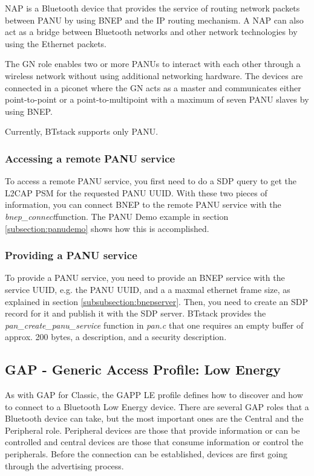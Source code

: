 NAP is a Bluetooth device that provides the service of routing network packets between PANU by using BNEP and the IP routing mechanism. A NAP can also act as a bridge between Bluetooth networks and other network technologies by using the Ethernet packets.

The GN role enables two or more PANUs to interact with each other through a wireless network without using additional networking hardware. The devices are connected in a piconet where the GN acts as a master and communicates either point-to-point or a point-to-multipoint with a maximum of seven PANU slaves by using BNEP.

Currently, BTstack supports only PANU.

\subsubsection{Accessing a remote PANU service}
To access a remote PANU service, you first need to do a SDP query to get the L2CAP PSM for the requested PANU UUID.
With these two pieces of information, you can connect BNEP to the remote PANU service with the \emph{bnep\_connect}function. The PANU Demo example in section \ref{subsection:panudemo} shows how this is accomplished.

\subsubsection{Providing a PANU service}
To provide a PANU service, you need to provide an BNEP service with the service UUID, e.g. the PANU UUID, and a a maxmal ethernet frame size, as explained in section \ref{subsubsection:bnepserver}. Then, you need to create an SDP record for it and publish it with the SDP server. BTstack provides the \emph{pan\_create\_panu\_service} function in \emph{pan.c} that one requires an empty buffer of approx. 200 bytes, a description, and a security description.

\subsection{GAP - Generic Access Profile: Low Energy}
As with GAP for Classic, the GAPP LE profile defines how to discover and how to connect to a Bluetooth Low Energy device. There are several GAP roles that a Bluetooth device can take, but the most important ones are the Central and the Peripheral role. Peripheral devices are those that provide information or can be controlled and central devices are those that consume information or control the peripherals. Before the connection can be established, devices are first going through the advertising process.

